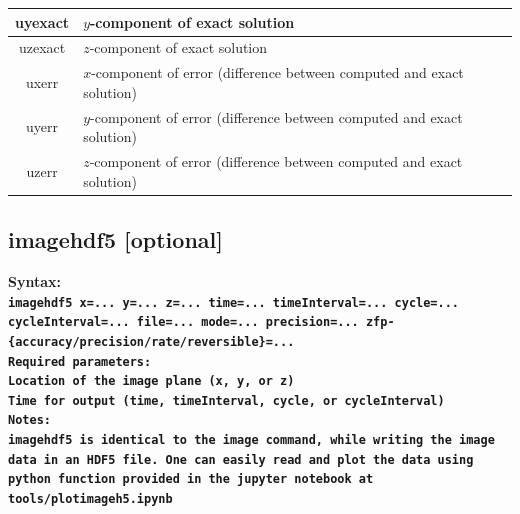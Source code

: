 \documentclass[11pt]{report}
\begin{document}
{\begin{center}
\begin{tabular}{|c|l|}
		uyexact    & $y$-component of exact solution                                         \\ \hline
		uzexact    & $z$-component of exact solution                                         \\ \hline
		uxerr      & $x$-component of error (difference between computed and exact solution) \\ \hline
		uyerr      & $y$-component of error (difference between computed and exact solution) \\ \hline
		uzerr      & $z$-component of error (difference between computed and exact solution) \\ \hline
	\end{tabular}
\end{center}



\subsection{imagehdf5 [optional]}
\label{keyword:imagehdf5}
\begin{flushleft}
\bf Syntax:\\ \tt imagehdf5 x=... y=... z=...
time=... timeInterval=... cycle=... cycleInterval=... file=... mode=... precision=...
zfp-\{accuracy/precision/rate/reversible\}=...\\ \bf Required
parameters:\\ \rm Location of the image plane (x, y, or z) \\ Time for output (time, timeInterval,
cycle, or cycleInterval)\\ \bf Notes: \\ imagehdf5 is identical to the image command, while writing the image data in an HDF5 file. One can easily read and plot the data using python function provided in the jupyter notebook at \verb+tools/plotimageh5.ipynb+
\end{flushleft}

}
\end{document}
